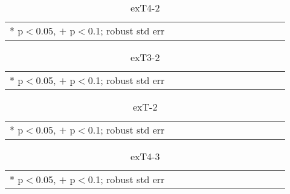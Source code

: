 \documentclass[11pt, letterpaper]{article}
\begin{document}
\begin{spacing}{1.4}
\begin{spacing}{.9} \begin{table}[H]\centering   \begin{scriptsize} \begin{tabular}{p{1.0in}p{.5in}p{.5in}p{.5in}p{.5in}p{.5in}p{.5in}p{.5in}p{.5in}p{.5in}p{.5 in}p{.5in}p{.5 in}}\hline  \hline * p$<$0.05, $+$ p$<$0.1; robust std err \end{tabular}\end{scriptsize}\caption{\label{exT4-2}exT4-2}\end{table} \end{spacing}

\begin{spacing}{.9} \begin{table}[H]\centering  \label{exT3-2} \begin{scriptsize} \begin{tabular}{p{1.0in}p{.5in}p{.5in}p{.5in}p{.5in}p{.5in}p{.5in}p{.5in}p{.5in}p{.5in}p{.5 in}p{.5in}p{.5 in}}\hline  \hline   * p$<$0.05, $+$ p$<$0.1; robust std err \end{tabular}\end{scriptsize}\caption{exT3-2}\end{table} \end{spacing}

\begin{spacing}{.9} \begin{table}[H]\centering  \label{exT-2} \begin{scriptsize} \begin{tabular}{p{1.0in}p{.5in}p{.5in}p{.5in}p{.5in}p{.5in}p{.5in}p{.5in}p{.5in}p{.5in}p{.5 in}p{.5in}p{.5 in}}\hline  \hline   * p$<$0.05, $+$ p$<$0.1; robust std err \end{tabular}\end{scriptsize}\caption{exT-2}\end{table} \end{spacing}


\begin{spacing}{.9} \begin{table}[H]\centering  \label{exT4-3} \begin{scriptsize} \begin{tabular}{p{1.0in}p{.5in}p{.5in}p{.5in}p{.5in}p{.5in}p{.5in}p{.5in}p{.5in}p{.5in}p{.5 in}p{.5in}p{.5 in}}\hline  \hline   * p$<$0.05, $+$ p$<$0.1; robust std err \end{tabular}\end{scriptsize}\caption{exT4-3}\end{table} \end{spacing}


\end{spacing}
\end{document}
